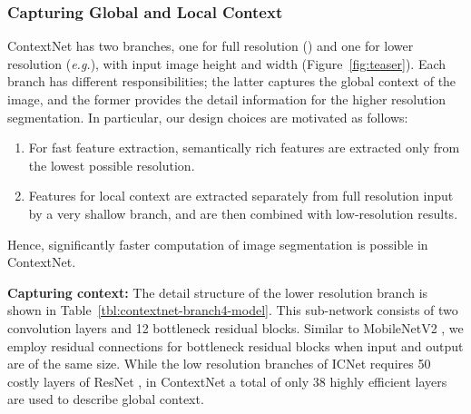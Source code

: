 \documentclass[runningheads]{llncs}
\def\eg{\emph{e.g.}}
\newcommand{\subsubsubsection}[1]{\vspace{0.2em}\noindent\textbf{\textcolor[rgb]{0,.1,.4}{#1:}}}
\begin{document}
\subsubsection{Capturing Global and Local Context}
ContextNet has two branches, one for full resolution () and one for lower resolution (\eg ), with input image height  and width  (Figure~\ref{fig:teaser}). Each branch has different responsibilities; the latter captures the global context of the image, and the former provides the detail information for the higher resolution segmentation. In particular, our design choices are motivated as follows:
\begin{enumerate}
  \item For fast feature extraction, semantically rich features are extracted only from the lowest possible resolution.
  \item Features for local context are extracted separately from full resolution input by a very shallow branch, and are then combined with low-resolution results.
\end{enumerate}
Hence, significantly faster computation of image segmentation is possible in ContextNet.
\begin{table}[t]
\begin{center}
\end{center}
\caption{Branch-4 for compressed input. Repeated block use stride 1 after first block/layer.}\label{tbl:contextnet-branch4-model}
\end{table}

\subsubsubsection{Capturing context} The detail structure of the lower resolution branch is shown in Table~\ref{tbl:contextnet-branch4-model}. This sub-network consists of two convolution layers and 12 bottleneck residual blocks. Similar to MobileNetV2 \cite{sandler2018}, we employ residual connections for bottleneck residual blocks when input and output are of the same size. While the low resolution branches of ICNet \cite{zhao2017b} requires 50 costly layers of ResNet \cite{he2015}, in ContextNet a total of only 38 highly efficient layers are used to describe global context.
\end{document}
